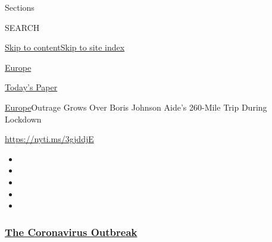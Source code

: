 Sections

SEARCH

\protect\hyperlink{site-content}{Skip to
content}\protect\hyperlink{site-index}{Skip to site index}

\href{https://www.nytimes3xbfgragh.onion/section/world/europe}{Europe}

\href{https://myaccount.nytimes3xbfgragh.onion/auth/login?response_type=cookie\&client_id=vi}{}

\href{https://www.nytimes3xbfgragh.onion/section/todayspaper}{Today's
Paper}

\href{/section/world/europe}{Europe}\textbar{}Outrage Grows Over Boris
Johnson Aide's 260-Mile Trip During Lockdown

\url{https://nyti.ms/3gjddjE}

\begin{itemize}
\item
\item
\item
\item
\item
\end{itemize}

\hypertarget{the-coronavirus-outbreak}{%
\subsubsection{\texorpdfstring{\href{https://www.nytimes3xbfgragh.onion/news-event/coronavirus?name=styln-coronavirus-national\&region=TOP_BANNER\&variant=undefined\&block=storyline_menu_recirc\&action=click\&pgtype=Article\&impression_id=5404bb90-e395-11ea-9f52-e335c4ed056e}{The
Coronavirus
Outbreak}}{The Coronavirus Outbreak}}\label{the-coronavirus-outbreak}}

